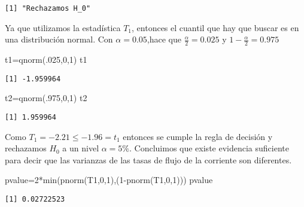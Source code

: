 \documentclass[
  a4paper,
  oneside,
  openany]{book}
\newenvironment{Shaded}{\begin{snugshade}}{\end{snugshade}}
\newcommand{\DecValTok}[1]{\textcolor[rgb]{0.00,0.00,0.81}{#1}}
\newcommand{\FunctionTok}[1]{\textcolor[rgb]{0.00,0.00,0.00}{#1}}
\newcommand{\NormalTok}[1]{#1}
\newcommand{\OtherTok}[1]{\textcolor[rgb]{0.56,0.35,0.01}{#1}}
\newcommand{\SpecialCharTok}[1]{\textcolor[rgb]{0.00,0.00,0.00}{#1}}
\begin{document}
\begin{verbatim}
[1] "Rechazamos H_0"
\end{verbatim}

Ya que utilizamos la estadística \(T_1\), entonces el cuantil que hay que buscar es en una distribución normal. Con \(\alpha=0.05\),hace que \(\frac{\alpha}{2}=0.025\) y \(1-\frac{\alpha}{2}=0.975\)

\begin{Shaded}
\begin{Highlighting}[]
\NormalTok{t1}\OtherTok{=}\FunctionTok{qnorm}\NormalTok{(.}\DecValTok{025}\NormalTok{,}\DecValTok{0}\NormalTok{,}\DecValTok{1}\NormalTok{)}
\NormalTok{t1}
\end{Highlighting}
\end{Shaded}

\begin{verbatim}
[1] -1.959964
\end{verbatim}

\begin{Shaded}
\begin{Highlighting}[]
\NormalTok{t2}\OtherTok{=}\FunctionTok{qnorm}\NormalTok{(.}\DecValTok{975}\NormalTok{,}\DecValTok{0}\NormalTok{,}\DecValTok{1}\NormalTok{)}
\NormalTok{t2}
\end{Highlighting}
\end{Shaded}

\begin{verbatim}
[1] 1.959964
\end{verbatim}

Como \(T_1=-2.21\leq -1.96 =t_1\) entonces se cumple la regla de decisión y rechazamos \(H_0\) a un nivel \(\alpha=5\%\). Concluimos que existe evidencia suficiente para decir que las varianzas de las tasas de flujo de la corriente son diferentes.

\begin{Shaded}
\begin{Highlighting}[]
\NormalTok{pvalue}\OtherTok{=}\DecValTok{2}\SpecialCharTok{*}\FunctionTok{min}\NormalTok{(}\FunctionTok{pnorm}\NormalTok{(T1,}\DecValTok{0}\NormalTok{,}\DecValTok{1}\NormalTok{),(}\DecValTok{1}\SpecialCharTok{{-}}\FunctionTok{pnorm}\NormalTok{(T1,}\DecValTok{0}\NormalTok{,}\DecValTok{1}\NormalTok{)))}
\NormalTok{pvalue}
\end{Highlighting}
\end{Shaded}

\begin{verbatim}
[1] 0.02722523
\end{verbatim}
\end{document}
